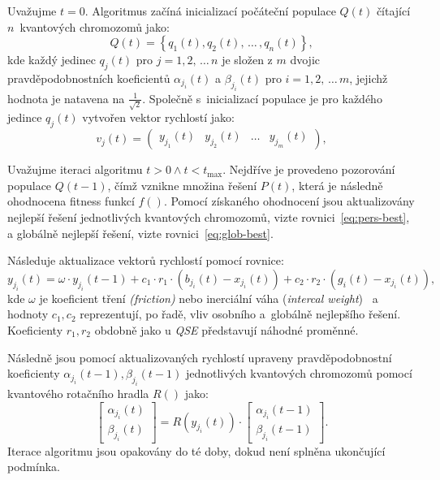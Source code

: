 Uvažujme $t=0$. Algoritmus začíná inicializací počáteční populace $Q\left(t\right)$ čítající $n$~kvantových chromozomů jako: 
\begin{equation*}
    Q\left(t\right) = \left\{q_1\left(t\right), q_2\left(t\right),\,\dots\,,q_n\left(t\right)\right\},
\end{equation*}
kde každý jedinec $q_j\left(t\right)$ pro $j=1,2,\,\dots\,n$ je složen z $m$ dvojic pravděpodobnostních koeficientů $\alpha_{j_i}\left(t\right)$ a $\beta_{j_i}\left(t\right)$ pro $i=1,2,\,\dots\,m$, jejichž hodnota je natavena na $\frac{1}{\sqrt{2}}$.
Společně s~inicializací populace je pro každého jedince $q_j\left(t\right)$ vytvořen vektor rychlostí jako:
\begin{equation*}
    v_j\left(t\right) = \begin{pmatrix} y_{j_1}\left(t\right) & y_{j_2}\left(t\right) & \dots & y_{j_m}\left(t\right) \end{pmatrix},
\end{equation*}

Uvažujme iteraci algoritmu $t>0 \wedge t<t_{\text{max}}$. 
Nejdříve je provedeno pozorování populace $Q\left(t-1\right)$, čímž vznikne množina řešení $P\left(t\right)$, která je následně ohodnocena fitness funkcí $f\left(\right)$. 
Pomocí získaného ohodnocení jsou aktualizovány nejlepší řešení jednotlivých kvantových chromozomů, vizte rovnici~\ref{eq:pers-best}, a globálně nejlepší řešení, vizte rovnici~\ref{eq:glob-best}. 

Následuje aktualizace vektorů rychlostí pomocí rovnice:
\begin{equation*}
    y_{j_i}\left(t\right) = \omega \cdot y_{j_i}\left(t-1\right) + c_1 \cdot r_1 \cdot (b_{j_i}\left(t\right) - x_{j_i}\left(t\right)) + c_2 \cdot r_2 \cdot (g_i\left(t\right) - x_{j_i}\left(t\right)),
\end{equation*}
kde $\omega$ je koeficient tření \emph{(friction)} nebo inerciální váha (\emph{intercal weight})~\cite{PSO-c1c2w} a hodnoty $c_1,c_2$ reprezentují, po řadě, vliv osobního a~globálně nejlepšího řešení. 
Koeficienty $r_1, r_2$ obdobně jako u \emph{QSE} představují náhodné proměnné. 

Následně jsou pomocí aktualizovaných rychlostí upraveny pravděpodobnostní koeficienty $\alpha_{j_i}\left(t-1\right), \beta_{j_i}\left(t-1\right)$ jednotlivých kvantových chromozomů pomocí kvantového rotačního hradla $R\left(\right)$ jako: 
\begin{equation*}
    \begin{bmatrix}
        \alpha_{j_i}\left(t\right) \\
        \beta_{j_i}\left(t\right)
    \end{bmatrix}
    =
    R\left(y_{j_i}\left(t\right)\right) \cdot
    \begin{bmatrix}
        \alpha_{j_i}\left(t-1\right) \\
        \beta_{j_i}\left(t-1\right) 
    \end{bmatrix}.
\end{equation*}
Iterace algoritmu jsou opakovány do té doby, dokud není splněna ukončující podmínka. 

